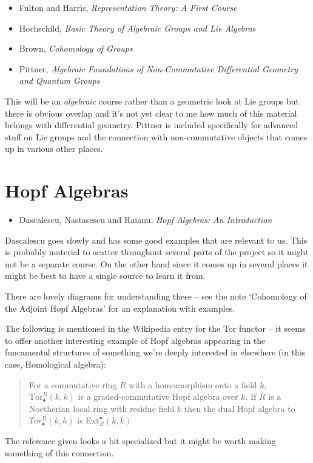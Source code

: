 \documentclass[article]{article}
\begin{document}
\begin{itemize}
	\item{Fulton and Harris, \textit{Representation Theory: A First Course}}
	\item{Hochschild, \textit{Basic Theory of Algebraic Groups and Lie Algebras}}
	\item{Brown, \textit{Cohomology of Groups}}
	\item{Pittner, \textit{Algebraic Foundations of Non-Commutative Differential Geometry and Quantum Groups}}
\end{itemize}

This will be an \textit{algebraic} course rather than a geometric look at Lie groups but there is obvious overlap and it's not yet clear to me how much of this material belongs with differential geometry. Pittner is included specifically for advanced stuff on Lie groups and the connection with non-commutative objects that comes up in various other places.

\section{Hopf Algebras}

\begin{itemize}
	\item{Dascalescu, Nastasescu and Raianu, \textit{Hopf Algebras: An Introduction}}
\end{itemize}

Dascalescu goes slowly and has some good examples that are relevant to us. This is probably material to scatter throughout several parts of the project so it might not be a separate course. On the other hand since it comes up in several places it might be best to have a single source to learn it from.

There are lovely diagrams for understanding these -- see the note `Cohomology of the Adjoint Hopf Algebras' for an explanation with examples.

The following is mentioned in the Wikipedia entry for the Tor functor -- it seems to offer another interesting example of Hopf algebras appearing in the funcamental structures of something we're deeply interested in elsewhere (in this case, Homological algebra):
\begin{quote}
	For a commutative ring $R$ with a homomorphism onto a field $k$, $\text{Tor}_\bullet^R(k, k)$ is a graded-commutative Hopf algebra over $k$. If $R$ is a Noetherian local ring with residue field $k$ then the dual Hopf algebra to $Tor_\bullet^R(k,k)$ is $\text{Ext}^\bullet_R(k, k)$
\end{quote}
The reference given looks a bit specialized but it might be worth making something of this connection.
\end{document}
